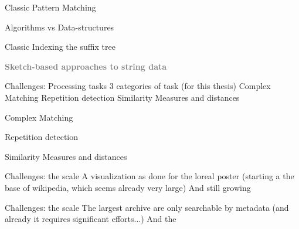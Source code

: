 \begin{frame}{Classic Pattern Matching}

\end{frame}

\begin{frame}{Algorithms vs Data-structures}

\end{frame}

\begin{frame}{Classic Indexing the suffix tree}

\end{frame}

\begin{frame}
    \vfill
    \bigskip
    \begin{center}
        \textbf{\textcolor{gray}{Sketch-based approaches to   string data}}
    \end{center}
    \vfill
\end{frame}

\begin{frame}{Challenges: Processing tasks}
3 categories of task (for this thesis)
Complex Matching
Repetition detection
Similarity Measures and distances
\end{frame}

 \begin{frame}{Complex Matching}
    
 \end{frame}

 \begin{frame}{Repetition detection}
    
 \end{frame}

 \begin{frame}{Similarity Measures and distances}
    
 \end{frame}

\begin{frame}{Challenges: the scale}
    A visualization as done for the loreal poster (starting a the base of wikipedia, which seems already very large)
    And still growing
\end{frame}

\begin{frame}{Challenges: the scale}
    The largest archive are only searchable by metadata (and already it requires significant efforts...)
    And the 
\end{frame}

